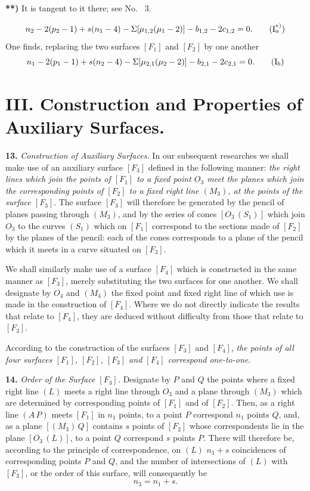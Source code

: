 \documentclass{article}
\begin{document}
\textbf{**)} It is tangent to it there; see No.~ 3.

\[
n_2 - 2(p_2 - 1) + s(n_1 - 4) - \Sigma [\mu_{1, 2}(\mu_1 - 2)] - b_{1, 2} - 2c_{1, 2} = 0. \tag{$\mathrm{I}_a^{*)}$}
\]
One finds, replacing the two surfaces $[F_1]$ and $[F_2]$ by one another
\[
n_1 - 2(p_1 - 1) + s(n_2 - 4) - \Sigma [\mu_{2, 1}(\mu_2 - 2)] - b_{2, 1} - 2c_{2, 1} = 0. \tag{$\mathrm{I}_b$}
\]

\section*{III. Construction and Properties of Auxiliary Surfaces.}

\textbf{13.} \emph{Construction of Auxiliary Surfaces.} In our subsequent researches we shall make use of an auxiliary surface $[F_3]$ defined in the following manner: \emph{the right lines which join the points of $[F_1]$ to a fixed point $O_3$ meet the planes which join the corresponding points of $[F_2]$ to a fixed right line $(M_3)$, at the points of the surface $[F_3]$}. The surface $[F_3]$ will therefore be generated by the pencil of planes passing through $(M_3)$, and by the series of cones $[O_3\,(S_1)]$ which join $O_3$ to the curves $(S_1)$ which on $[F_1]$ correspond to the sections made of $[F_2]$ by the planes of the pencil: each of the cones corresponds to a plane of the pencil which it meets in a curve situated on $[F_3]$.

We shall similarly make use of a surface $[F_4]$ which is constructed in the same manner as $[F_3]$, merely substituting the two surfaces for one another. We shall designate by $O_4$ and $(M_4)$ the fixed point and fixed right line of which use is made in the construction of $[F_4]$. Where we do not directly indicate the results that relate to $[F_4]$, they are deduced without difficulty from those that relate to $[F_3]$.

According to the construction of the surfaces $[F_3]$ and $[F_4]$, \emph{the points of all four surfaces $[F_1]$, $[F_2]$, $[F_3]$ and $[F_4]$ correspond one-to-one}.

\textbf{14.} \emph{Order of the Surface $[F_3]$.} Designate by $P$ and $Q$ the points where a fixed right line $(L)$ meets a right line through $O_3$ and a plane through $(M_3)$ which are determined by corresponding points of $[F_1]$ and of $[F_2]$. Then, as a right line $(A\,P)$ meets $[F_1]$ in $n_1$ points, to a point $P$ correspond $n_1$ points $Q$, and, as a plane $[(M_3)\,Q]$ contains $s$ points of $[F_2]$ whose correspondents lie in the plane $[O_3\,(L)]$, to a point $Q$ correspond $s$ points $P$. There will therefore be, according to the principle of correspondence, on $(L)$ $n_1 + s$ coincidences of corresponding points $P$ and $Q$, and the number of intersections of $(L)$ with $[F_3]$, or the order of this surface, will consequently be
\[
n_3 = n_1 + s.
\]
\end{document}
